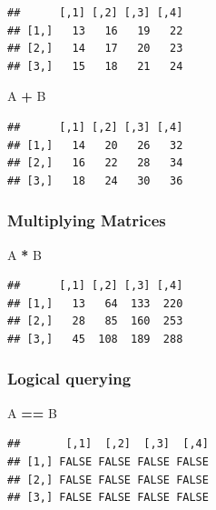 \documentclass[]{book}
\newenvironment{Shaded}{\begin{snugshade}}{\end{snugshade}}
\newcommand{\NormalTok}[1]{#1}
\newcommand{\OperatorTok}[1]{\textcolor[rgb]{0.81,0.36,0.00}{\textbf{#1}}}
\newcommand{\StringTok}[1]{\textcolor[rgb]{0.31,0.60,0.02}{#1}}
\theoremstyle{definition}
\theoremstyle{definition}
\theoremstyle{definition}
\theoremstyle{remark}
\begin{document}
\begin{verbatim}
##      [,1] [,2] [,3] [,4]
## [1,]   13   16   19   22
## [2,]   14   17   20   23
## [3,]   15   18   21   24
\end{verbatim}

\begin{Shaded}
\begin{Highlighting}[]
\NormalTok{A }\OperatorTok{+}\StringTok{ }\NormalTok{B}
\end{Highlighting}
\end{Shaded}

\begin{verbatim}
##      [,1] [,2] [,3] [,4]
## [1,]   14   20   26   32
## [2,]   16   22   28   34
## [3,]   18   24   30   36
\end{verbatim}

\hypertarget{multiplying-matrices}{%
\subsubsection{Multiplying Matrices}\label{multiplying-matrices}}

\begin{Shaded}
\begin{Highlighting}[]
\NormalTok{A }\OperatorTok{*}\StringTok{ }\NormalTok{B}
\end{Highlighting}
\end{Shaded}

\begin{verbatim}
##      [,1] [,2] [,3] [,4]
## [1,]   13   64  133  220
## [2,]   28   85  160  253
## [3,]   45  108  189  288
\end{verbatim}

\hypertarget{logical-querying}{%
\subsubsection{Logical querying}\label{logical-querying}}

\begin{Shaded}
\begin{Highlighting}[]
\NormalTok{A }\OperatorTok{==}\StringTok{ }\NormalTok{B}
\end{Highlighting}
\end{Shaded}

\begin{verbatim}
##       [,1]  [,2]  [,3]  [,4]
## [1,] FALSE FALSE FALSE FALSE
## [2,] FALSE FALSE FALSE FALSE
## [3,] FALSE FALSE FALSE FALSE
\end{verbatim}
\end{document}
